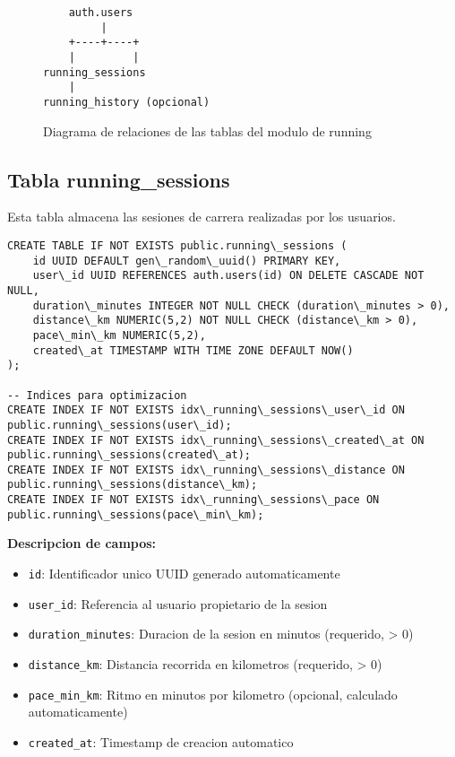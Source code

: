 \documentclass[12pt,a4paper]{article}
\begin{document}
\begin{figure}[h]
\centering
\begin{verbatim}
    auth.users
         |
    +----+----+
    |         |
running_sessions
    |
running_history (opcional)
\end{verbatim}
\caption{Diagrama de relaciones de las tablas del modulo de running}
\end{figure}

\subsection{Tabla running\_sessions}

Esta tabla almacena las sesiones de carrera realizadas por los usuarios.

\begin{lstlisting}[caption=Estructura completa de \texttt{running\_sessions}]
CREATE TABLE IF NOT EXISTS public.running\_sessions (
    id UUID DEFAULT gen\_random\_uuid() PRIMARY KEY,
    user\_id UUID REFERENCES auth.users(id) ON DELETE CASCADE NOT NULL,
    duration\_minutes INTEGER NOT NULL CHECK (duration\_minutes > 0),
    distance\_km NUMERIC(5,2) NOT NULL CHECK (distance\_km > 0),
    pace\_min\_km NUMERIC(5,2),
    created\_at TIMESTAMP WITH TIME ZONE DEFAULT NOW()
);

-- Indices para optimizacion
CREATE INDEX IF NOT EXISTS idx\_running\_sessions\_user\_id ON public.running\_sessions(user\_id);
CREATE INDEX IF NOT EXISTS idx\_running\_sessions\_created\_at ON public.running\_sessions(created\_at);
CREATE INDEX IF NOT EXISTS idx\_running\_sessions\_distance ON public.running\_sessions(distance\_km);
CREATE INDEX IF NOT EXISTS idx\_running\_sessions\_pace ON public.running\_sessions(pace\_min\_km);
\end{lstlisting}

\textbf{Descripcion de campos:}
\begin{itemize}
    \item \texttt{id}: Identificador unico UUID generado automaticamente
    \item \texttt{user\_id}: Referencia al usuario propietario de la sesion
    \item \texttt{duration\_minutes}: Duracion de la sesion en minutos (requerido, > 0)
    \item \texttt{distance\_km}: Distancia recorrida en kilometros (requerido, > 0)
    \item \texttt{pace\_min\_km}: Ritmo en minutos por kilometro (opcional, calculado automaticamente)
    \item \texttt{created\_at}: Timestamp de creacion automatico
\end{itemize}
\end{document}
